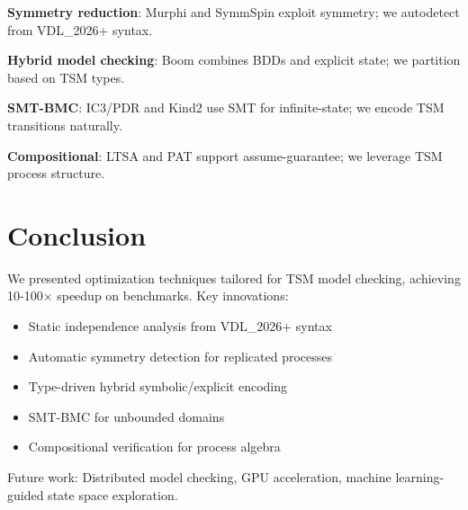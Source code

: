 \documentclass[conference]{IEEEtran}
\begin{document}
\textbf{Symmetry reduction}: Murphi \cite{murphi} and SymmSpin exploit symmetry; we autodetect from VDL\_2026+ syntax.

\textbf{Hybrid model checking}: Boom \cite{boom} combines BDDs and explicit state; we partition based on TSM types.

\textbf{SMT-BMC}: IC3/PDR \cite{ic3} and Kind2 \cite{kind2} use SMT for infinite-state; we encode TSM transitions naturally.

\textbf{Compositional}: LTSA \cite{ltsa} and PAT \cite{pat} support assume-guarantee; we leverage TSM process structure.

\section{Conclusion}

We presented optimization techniques tailored for TSM model checking, achieving 10-100× speedup on benchmarks. Key innovations:
\begin{itemize}
\item Static independence analysis from VDL\_2026+ syntax
\item Automatic symmetry detection for replicated processes
\item Type-driven hybrid symbolic/explicit encoding
\item SMT-BMC for unbounded domains
\item Compositional verification for process algebra
\end{itemize}

Future work: Distributed model checking, GPU acceleration, machine learning-guided state space exploration.
\end{document}
